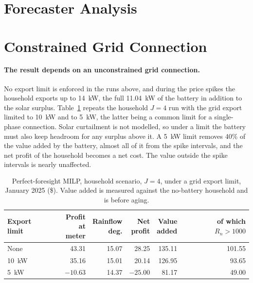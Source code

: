 \section{Forecaster Analysis}

\section{Constrained Grid Connection}
\paragraph{The result depends on an unconstrained grid connection.}
No export limit is enforced in the runs above, and during the price spikes the household
exports up to 14~kW, the full 11.04~kW of the battery in addition to the solar
surplus. Table~\ref{tab:milp:export} repeats the household $J = 4$ run with the grid
export limited to 10~kW and to 5~kW, the latter being a common limit for a single-phase
connection. Solar curtailment is not modelled, so under a limit the battery must also
keep headroom for any surplus above it. A 5~kW limit removes 40\% of the value added by
the battery, almost all of it from the spike intervals, and the net profit of the
household becomes a net cost. The value outside the spike intervals is nearly
unaffected.

\begin{table}[htbp]
    \centering
    \small
    \caption{Perfect-foresight MILP, household scenario, $J=4$, under a grid export limit,
    January 2025 (\$). Value added is measured against the no-battery household and is
    before aging.}
    \label{tab:milp:export}
    \begin{tabular}{@{}lrrrrr@{}}
        \toprule
        Export limit & \shortstack{Profit\\at meter} & \shortstack{Rainflow\\deg.} &
        \shortstack{Net\\profit} & \shortstack{Value\\added} &
        \shortstack{of which\\$R_n > 1000$} \\
        \midrule
        None  & 43.31     & 15.07 & 28.25     & 135.11 & 101.55 \\
        10~kW & 35.16     & 15.01 & 20.14     & 126.95 & 93.65 \\
        5~kW  & $-10.63$  & 14.37 & $-25.00$  & 81.17  & 49.00 \\
        \bottomrule
    \end{tabular}
\end{table}

